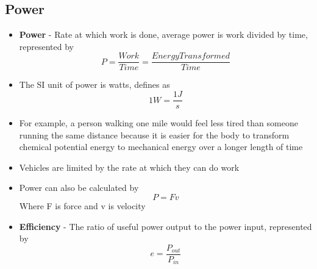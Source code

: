 \subsection{Power}
\begin{itemize}
    \item \textbf{Power} - Rate at which work is done, average power is work divided by time, represented by \[P=\frac{Work}{Time}=\frac{Energy Transformed}{Time}\]
    \item The SI unit of power is watts, defines as \[1W=\frac{1J}{s}\]
    \item For example, a person walking one mile would feel less tired than someone running the same distance because it is easier for the body to transform chemical potential energy to mechanical energy over a longer length of time
    \item Vehicles are limited by the rate at which they can do work
    \item Power can also be calculated by \[P=Fv\] Where F is force and v is velocity
    \item \textbf{Efficiency} - The ratio of useful power output to the power input, represented by  \[e=\frac{P_{out}}{P_{in}}\]
\end{itemize}

\newpage
